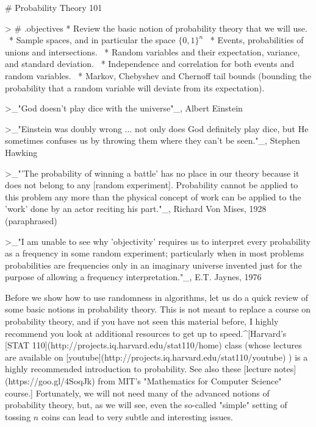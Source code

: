 
#  Probability Theory 101

> # { .objectives }
* Review the basic notion of probability theory that we will use. \
* Sample spaces, and in particular the space $\{0,1\}^n$ \
* Events, probabilities of unions and intersections. \
* Random variables and their expectation, variance, and standard deviation. \
* Independence and correlation for both events and random variables. \
* Markov, Chebyshev and Chernoff tail bounds (bounding the probability that a random variable will deviate from its expectation).



>_"God doesn't play dice with the universe"_, Albert Einstein

>_"Einstein was doubly wrong ... not only does God definitely play dice, but He sometimes confuses us by throwing them where they can't be seen."_, Stephen Hawking

>_"'The probability of winning a battle' has no place in our theory because it does not belong to any [random experiment]. Probability cannot be applied to this problem any more than the physical concept of work can be applied to the 'work' done by an actor reciting his part."_, Richard Von Mises, 1928 (paraphrased)

>_"I am unable to see why 'objectivity' requires us to interpret every probability as a frequency in some random experiment; particularly when in most problems probabilities are frequencies only in an imaginary universe invented just for the purpose of allowing a frequency interpretation."_, E.T. Jaynes, 1976


Before we show how to use randomness in algorithms, let us do a quick review of some basic notions in probability theory.
This is not meant to replace a course on probability theory, and if you have not seen this material before, I highly recommend you look at additional resources to get up to speed.^[Harvard's [STAT 110](http://projects.iq.harvard.edu/stat110/home) class (whose lectures are available on [youtube](http://projects.iq.harvard.edu/stat110/youtube) ) is a highly recommended introduction to probability. See also these [lecture notes](https://goo.gl/4SoqJk) from MIT's "Mathematics for Computer Science" course.]
Fortunately, we will not need many of the advanced notions of probability theory, but, as we will see, even the so-called "simple" setting of tossing $n$ coins can lead to very subtle and interesting issues.




